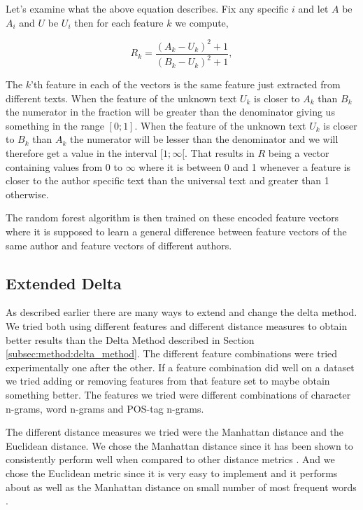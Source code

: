 Let's examine what the above equation describes. Fix any specific $i$ and let
$A$ be $A_i$ and $U$ be $U_i$ then for each feature $k$ we compute,

\begin{equation}
\label{eq:rf-encode}
    R_k = \frac{(A_k-U_k)^2+1}{(B_k-U_k)^2+1},
\end{equation}

The $k$'th feature in each of the vectors is the same feature just extracted
from different texts. When the feature of the unknown text $U_k$ is closer to
$A_k$ than $B_k$ the numerator in the fraction will be greater than the
denominator giving us something in the range $[0; 1]$. When the feature of the
unknown text $U_k$ is closer to $B_k$ than $A_k$ the numerator will be lesser
than the denominator and we will therefore get a value in the interval
$[1; \infty[$. That results in $R$ being a vector containing values from 0 to
$\infty$ where it is between 0 and 1 whenever a feature is closer to the author
specific text than the universal text and greater than 1 otherwise.

The random forest algorithm is then trained on these encoded feature vectors
where it is supposed to learn a general difference between feature vectors of
the same author and feature vectors of different authors.

\subsection{Extended Delta} \label{subsec:method:extended_delta}
As described earlier there are many ways to extend and change the delta
method. We tried both using different features and different distance
measures to obtain better results than the Delta Method described in Section
\ref{subsec:method:delta_method}. The different feature combinations were tried
experimentally one after the other. If a feature combination did well on a
dataset we tried adding or removing features from that feature set to maybe
obtain something better. The features we tried were different combinations of
character n-grams, word n-grams and \gls{POS}-tag n-grams.

The different distance measures we tried were the Manhattan distance and the
Euclidean distance. We chose the Manhattan distance since it has been shown to
consistently perform well when compared to other distance metrics
\cite{evert2015towards}. And we chose the Euclidean metric since it is very easy
to implement and it performs about as well as the Manhattan distance on small
number of most frequent words \cite{evert2015towards}.


